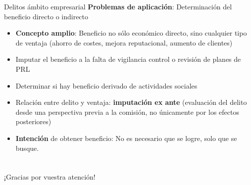 \documentclass{beamer}
\begin{document}
    \begin{frame}{Delitos ámbito empresarial}
        \textbf{Problemas de aplicación}: Determinación del beneficio directo o indirecto
        \begin{itemize}
            \small
            \item \textbf{Concepto amplio}: Beneficio no sólo económico directo, sino cualquier tipo de ventaja (ahorro de costes, mejora reputacional, aumento de clientes)
            \item Imputar el beneficio a la falta de vigilancia control o revisión de planes de PRL
            \item Determinar si hay beneficio derivado de actividades sociales
            \item Relación entre delito y ventaja: \textbf{imputación ex ante} (evaluación del delito desde una perspectiva previa a la comisión, no únicamente por los efectos posteriores)
            \item \textbf{Intención} de obtener beneficio: No es necesario que se logre, solo que se busque.
        \end{itemize}
    \end{frame}


    \section{}

    \subsection{}
    \begin{frame}
        \begin{block}{}
            \centering
            ¡Gracias por vuestra atención!
        \end{block}
    \end{frame}
\end{document}
